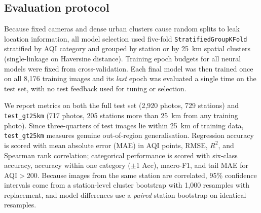 \documentclass[conference]{IEEEtran}
\begin{document}
\subsection{Evaluation protocol}
Because fixed cameras and dense urban clusters cause random splits to leak
location information, all model selection used five-fold
\texttt{StratifiedGroupKFold} stratified by AQI category and grouped by station
or by 25~km spatial clusters (single-linkage on Haversine distance). Training
epoch budgets for all neural models were fixed from cross-validation. Each final
model was then trained once on all 8,176 training images and its \emph{last}
epoch was evaluated a single time on the test set, with no test feedback used
for tuning or selection.

We report metrics on both the full test set (2,920 photos, 729 stations) and
\texttt{test\_gt25km} (717 photos, 205 stations more than 25~km from any
training photo). Since three-quarters of test images lie within 25~km of
training data, \texttt{test\_gt25km} measures genuine out-of-region
generalisation. Regression accuracy is scored with mean absolute error (MAE) in
AQI points, RMSE, $R^2$, and Spearman rank correlation; categorical performance
is scored with six-class accuracy, accuracy within one category ($\pm$1 Acc),
macro-F1, and tail MAE for AQI$>$200. Because images from the same station are
correlated, 95\% confidence intervals come from a station-level cluster
bootstrap with 1,000 resamples with replacement, and model differences use a
\emph{paired} station bootstrap on identical resamples.
\end{document}
